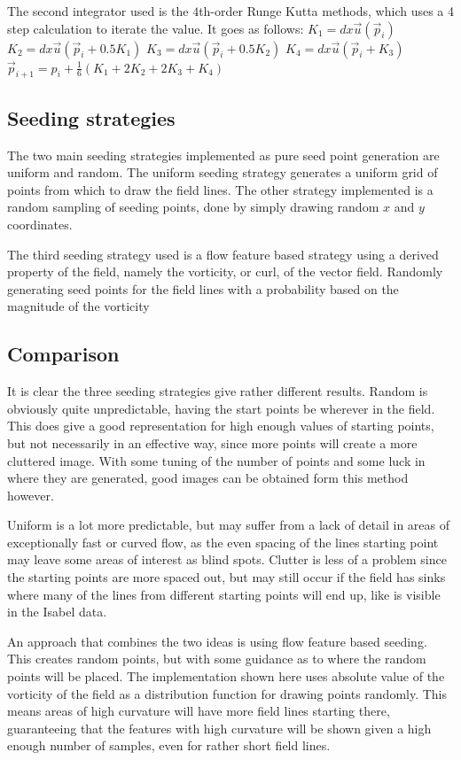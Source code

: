 \documentclass{article}
\begin{document}
The second integrator used is the $4$th-order Runge Kutta methods, which uses a 4 step calculation
to iterate the value. It goes as follows:
$K_1 = dx \vec{u}(\vec{p}_i)$
$K_2 = dx \vec{u}(\vec{p}_{i} + 0.5 K_1)$
$K_3 = dx \vec{u}(\vec{p}_{i} + 0.5 K_2)$
$K_4 = dx \vec{u}(\vec{p}_{i} + K_3)$
$\vec{p}_{i+1} = p_i + \frac{1}{6} (K_1 + 2K_2 + 2K_3 + K_4)$

\subsection{Seeding strategies}
The two main seeding strategies implemented as pure seed point generation are uniform and random. The
uniform seeding strategy generates a uniform grid of points from which to draw the field lines.
The other strategy implemented is a random sampling of seeding points, done by simply drawing random
$x$ and $y$ coordinates.

The third seeding strategy used is a flow feature based strategy using a derived property
of the field, namely the vorticity, or curl, of the vector field. Randomly generating
seed points for the field lines with a probability based on the magnitude of the
vorticity

\subsection{Comparison}

It is clear the three seeding strategies give rather different results. Random
is obviously quite unpredictable, having the start points be wherever in the field.
This does give a good representation for high enough values of starting points,
but not necessarily in an effective way, since more points will create a more
cluttered image. With some tuning of the number of points and some luck in where
they are generated, good images can be obtained form this method however.

Uniform is a lot more predictable, but may suffer from a lack of detail in areas
of exceptionally fast or curved flow, as the even spacing of the lines starting
point may leave some areas of interest as blind spots. Clutter is less of a problem
since the starting points are more spaced out, but may still occur if the field
has sinks where many of the lines from different starting points will end up, like
is visible in the Isabel data.

An approach that combines the two ideas is using flow feature based seeding. This
creates random points, but with some guidance as to where the random points will
be placed. The implementation shown here uses absolute value of the vorticity of
the field as a distribution function for drawing points randomly. This means areas
of high curvature will have more field lines starting there, guaranteeing that
the features with high curvature will be shown given a high enough number of samples,
even for rather short field lines.
\end{document}
